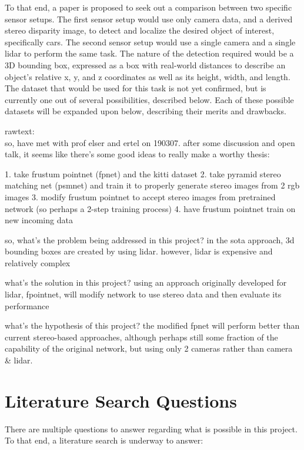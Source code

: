 To that end, a paper is proposed to seek out a comparison between two specific sensor setups. The first sensor setup would use only camera data, and a derived stereo disparity image, to detect and localize the desired object of interest, specifically cars. The second sensor setup would use a single camera and a single lidar to perform the same task. The nature of the detection required would be a 3D bounding box, expressed as a box with real-world distances to describe an object's relative x, y, and z coordinates as well as its height, width, and length. The dataset that would be used for this task is not yet confirmed, but is currently one out of several possibilities, described below. Each of these possible datasets will be expanded upon below, describing their merits and drawbacks.


rawtext: \\
so, have met with prof elser and ertel on 190307. after some discussion and open talk, it seems like there's some good ideas to really make a worthy thesis: 

1. take frustum pointnet (fpnet) and the kitti dataset
2. take pyramid stereo matching net (psmnet) and train it to properly generate stereo images from 2 rgb images
3. modify frustum pointnet to accept stereo images from pretrained network (so perhaps a 2-step training process)
4. have frustum pointnet train on new incoming data

so, what's the problem being addressed in this project? 
in the sota approach, 3d bounding boxes are created by using lidar. however, lidar is expensive and relatively complex

what's the solution in this project? 
using an approach originally developed for lidar, fpointnet, will modify network to use stereo data and then evaluate its performance

what's the hypothesis of this project?
the modified fpnet will perform better than current stereo-based approaches, although perhaps still some fraction of the capability of the original network, but using only 2 cameras rather than camera \& lidar.




\section{Literature Search Questions}
There are multiple questions to answer regarding what is possible in this project. To that end, a literature search is underway to answer:

